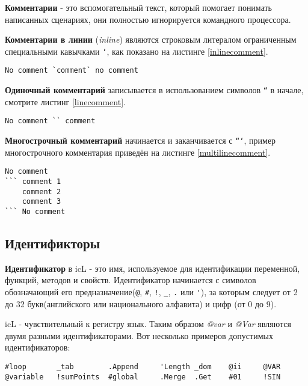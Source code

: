 \documentclass[a4paper, 14pt]{extarticle}
\begin{document}
	\textbf{Комментарии} - это вспомогательный текст, который помогает понимать написанных сценариях, они полностью игнорируется командного процессора. 
	
	\textbf{Комментарии в линии} (\textit{inline}) являются строковым литералом ограниченным специальными кавычками \texttt{`}, как показано на листинге \ref{inlinecomment}.
	
\begin{lstlisting}[caption=Комментарий в линии,label=inlinecomment]
No comment `comment` no comment
\end{lstlisting}
	
	\textbf{Одиночный комментарий} записывается в использованием символов \texttt{``} в начале, смотрите листинг \ref{linecomment}.
	
\begin{lstlisting}[caption=Одиночный комментарий,label=linecomment]
No comment `` comment
\end{lstlisting}
	
	\textbf{Многострочный комментарий} начинается и заканчивается с \texttt{```}, пример многострочного комментария приведён на листинге \ref{multilinecomment}.
	
\begin{lstlisting}[caption=Многострочный комментарий,label=multilinecomment]
No comment
``` comment 1
	comment 2
	comment 3
``` No comment
\end{lstlisting}
	
\subsection{Идентификторы}
	
	\textbf{Идентификатор} в icL - это имя, используемое для идентификации переменной, функций, методов и свойств. Идентификатор начинается с символов обозначающий его предназначение(\lstinline`@`, \lstinline`#`, \lstinline`!`, \lstinline`_`, \lstinline`.` или \lstinline`'`), за которым следует от 2 до 32 букв(английского или национального алфавита) и цифр (от 0 до 9).
	
	icL - чувствительный к регистру язык. Таким образом \textit{@var} и \textit{@Var} являются двумя разными идентификаторами. Вот несколько примеров допустимых идентификаторов:
	
\begin{lstlisting}[numbers=none]
#loop		_tab		.Append		'Length	_dom	@ii 	@VAR
@variable	!sumPoints	#global		.Merge	.Get	#01		!SIN
\end{lstlisting}
	
\end{document}
